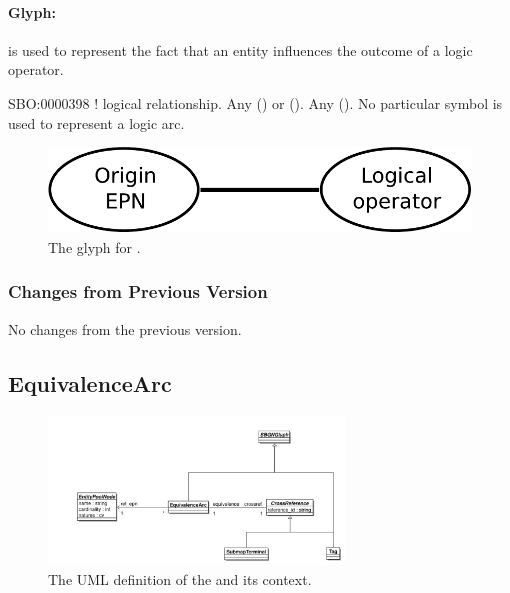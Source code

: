 \paragraph{Glyph:  }\label{sec:logicArc}

 is used to represent the fact that an entity influences
the outcome of a logic operator. 

\begin{glyphDescription}
 \glyphSboTerm SBO:0000398 ! logical relationship.
 \glyphOrigin Any  () or  ().
 \glyphTarget Any  ().
 \glyphEndPoint No particular symbol is used to represent a logic arc.
 \end{glyphDescription}

\begin{figure}[H]
  \centering
  \includegraphics[scale = 0.4]{images/logicArc}
  \caption{The \PD glyph for .}
  \label{fig:logicArc}
\end{figure}

\subsubsection{Changes from Previous Version}

No changes from the previous version.

\subsection{EquivalenceArc}
\label{defn:EquivalenceArc}

\begin{figure}[htb]
  \centering
  \includegraphics[width = 0.7\textwidth]{images/equivalencearcuml}
  \caption{The UML definition of the  and its context.}
  \label{fig:equivalencearcuml}
\end{figure}


